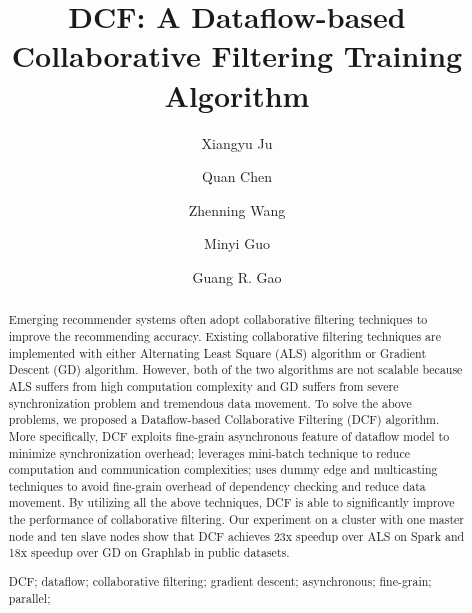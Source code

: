 \documentclass{llncs}
\begin{document}
%
\mainmatter              %
%
\title{DCF: A Dataflow-based Collaborative Filtering Training Algorithm}
%
%
\vspace{-10pt}
\author{Xiangyu Ju  \and Quan Chen  \and
Zhenning Wang  \and Minyi Guo  \and Guang R. Gao }
%
%
\vspace{-10pt}

\maketitle              %
\vspace{-25pt}
\begin{abstract}
Emerging recommender systems often adopt collaborative filtering techniques to improve the recommending accuracy. Existing collaborative filtering techniques are implemented with either Alternating Least Square (ALS) algorithm or Gradient Descent (GD) algorithm. However, both of the two algorithms are not scalable because ALS suffers from high computation complexity and GD suffers from severe synchronization problem and tremendous data movement. To solve the above problems, we proposed a Dataflow-based Collaborative Filtering (DCF) algorithm.
More specifically, DCF exploits fine-grain asynchronous feature of dataflow model to minimize synchronization overhead; leverages mini-batch technique to reduce computation and communication complexities; uses dummy edge and multicasting techniques to avoid fine-grain overhead of dependency checking and reduce data movement. By utilizing all the above techniques, DCF is able to significantly improve the performance of collaborative filtering. Our experiment on a cluster with one master node and ten slave nodes show that DCF achieves 23x speedup over ALS on Spark and 18x speedup over GD on Graphlab in public datasets.

\vspace{-5pt}

\begin{keywords} DCF; dataflow; collaborative filtering; gradient descent; asynchronous; fine-grain; parallel;
\end{keywords}
\vspace{-5pt}
\end{abstract}
\end{document}
